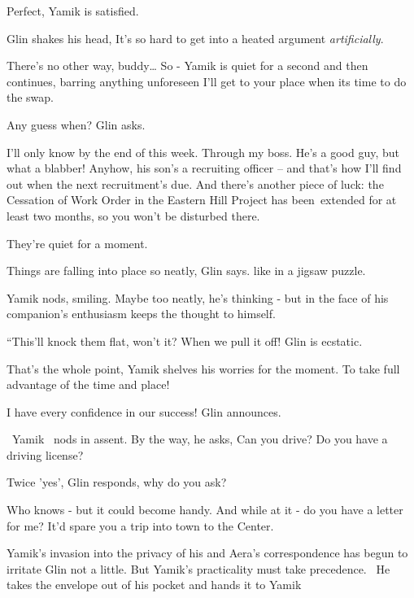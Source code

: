 \documentclass[12pt]{book}
\begin{document}
{\textquotedbl}Perfect,{\textquotedbl} Yamik is satisfied.

Glin shakes his head, {\textquotedbl}It's so hard to get into a heated argument \textit{artificially}.{\textquotedbl}

{\textquotedbl}There's no other way, buddy{\dots} So -{\textquotedbl} Yamik is quiet for a second and then continues,
{\textquotedbl}barring anything unforeseen I'll get to your place when its time to do the swap.{\textquotedbl}

{\textquotedbl}Any guess when?{\textquotedbl} Glin asks.

{\textquotedbl}I'll only know by the end of this week. Through my boss. He's a good guy, but what a blabber! Anyhow, his
son's a recruiting officer -- and that's how I'll find out when the next recruitment's due. And there's another piece
of luck: the Cessation of Work Order in the Eastern Hill Project has been~extended for at least two months, so you
won't be disturbed there.{\textquotedbl}

They're quiet for a moment.

{\textquotedbl}Things are falling into place so neatly,{\textquotedbl} Glin says. {\textquotedbl}like in a jigsaw
puzzle.{\textquotedbl}

Yamik nods, smiling. Maybe too neatly, he's thinking - but in the face of his companion's enthusiasm keeps the thought
to himself.

{}``This'll knock them flat, won't it? When we pull it off!{\textquotedbl} Glin is ecstatic.

{\textquotedbl}That's the whole point,{\textquotedbl} Yamik shelves his worries for the moment. {\textquotedbl}To take
full advantage of the time and place!{\textquotedbl}

{\textquotedbl}I have every confidence in our success!{\textquotedbl} Glin announces.

~Yamik \ nods in assent. {\textquotedbl}By the way,{\textquotedbl} he asks, {\textquotedbl}Can you drive? Do you have a
driving license{\textquotedbl}?

{\textquotedbl}Twice 'yes',{\textquotedbl} Glin responds, {\textquotedbl}why do you ask?{\textquotedbl}

{\textquotedbl}Who knows - but it could become handy. And while at it - do you have a letter for me? It'd spare you a
trip into town to the Center.{\textquotedbl}

Yamik's invasion into the privacy of his and Aera's correspondence has begun to irritate Glin not a little. But Yamik's
practicality must take precedence. \ He takes the envelope out of his pocket and hands it to Yamik ~
\end{document}
